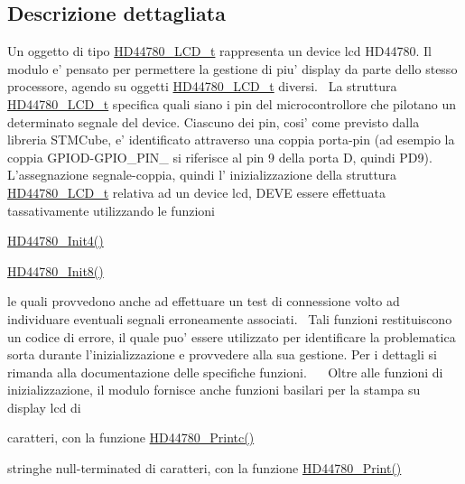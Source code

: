 \subsection{Descrizione dettagliata}
Un oggetto di tipo \hyperlink{struct_h_d44780___l_c_d__t}{H\+D44780\+\_\+\+L\+C\+D\+\_\+t} rappresenta un device lcd H\+D44780. Il modulo e' pensato per permettere la gestione di piu' display da parte dello stesso processore, agendo su oggetti \hyperlink{struct_h_d44780___l_c_d__t}{H\+D44780\+\_\+\+L\+C\+D\+\_\+t} diversi.~\newline
 La struttura \hyperlink{struct_h_d44780___l_c_d__t}{H\+D44780\+\_\+\+L\+C\+D\+\_\+t} specifica quali siano i pin del microcontrollore che pilotano un determinato segnale del device. Ciascuno dei pin, cosi' come previsto dalla libreria S\+T\+M\+Cube, e' identificato attraverso una coppia porta-\/pin (ad esempio la coppia G\+P\+I\+O\+D-\/\+G\+P\+I\+O\+\_\+\+P\+I\+N\+\_ si riferisce al pin 9 della porta D, quindi P\+D9). L'assegnazione segnale-\/coppia, quindi l' inizializzazione della struttura \hyperlink{struct_h_d44780___l_c_d__t}{H\+D44780\+\_\+\+L\+C\+D\+\_\+t} relativa ad un device lcd, D\+E\+V\+E essere effettuata tassativamente utilizzando le funzioni~\newline

\begin{DoxyItemize}
\item \hyperlink{group___h_d44780_ga0c08f9e41d770ebfa4af385a56b47b81}{H\+D44780\+\_\+\+Init4()}
\item \hyperlink{group___h_d44780_gad212907e20316f4fc0e93d7c7a8f338e}{H\+D44780\+\_\+\+Init8()}~\newline

\end{DoxyItemize}

le quali provvedono anche ad effettuare un test di connessione volto ad individuare eventuali segnali erroneamente associati.~\newline
 Tali funzioni restituiscono un codice di errore, il quale puo' essere utilizzato per identificare la problematica sorta durante l'inizializzazione e provvedere alla sua gestione. Per i dettagli si rimanda alla documentazione delle specifiche funzioni.~\newline
 ~\newline
 Oltre alle funzioni di inizializzazione, il modulo fornisce anche funzioni basilari per la stampa su display lcd di
\begin{DoxyItemize}
\item caratteri, con la funzione \hyperlink{group___h_d44780_ga57b8c6ca0b3c12e5f7273b3c373a6f17}{H\+D44780\+\_\+\+Printc()}
\item stringhe null-\/terminated di caratteri, con la funzione \hyperlink{group___h_d44780_ga3aedff8e2040e62db569fde955d3987b}{H\+D44780\+\_\+\+Print()}~\newline

\end{DoxyItemize}

